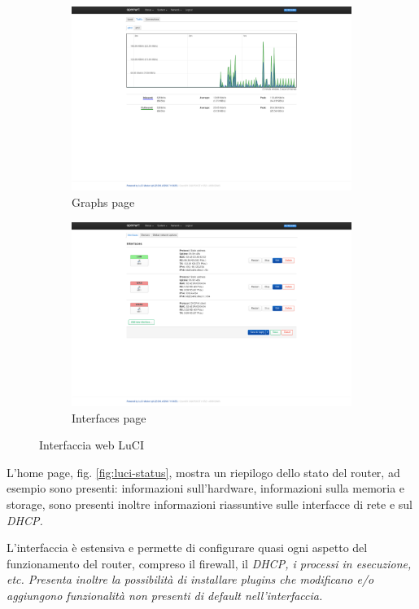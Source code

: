 \begin{figure}[H]
    \begin{subfigure}{0.5\linewidth}
        \centering
        \includegraphics[height=0.65\linewidth]{immagini/LuCI_graphs}
        \caption{Graphs page}
        \label{fig:luci-graphs}
    \end{subfigure}%
    \hfill
    \begin{subfigure}{0.5\linewidth}
        \centering
        \includegraphics[height=0.65\linewidth]{immagini/LuCI_interfaces}
        \caption{Interfaces page}
        \label{fig:luci-interfaces}
    \end{subfigure}%
    \caption{Interfaccia web LuCI}
\end{figure}


L'home page, fig. \ref{fig:luci-status}, mostra un riepilogo dello stato del router, ad esempio sono presenti: informazioni sull'hardware, informazioni sulla memoria e storage, sono presenti inoltre informazioni riassuntive sulle interfacce di rete e sul \it{DHCP}.

L'interfaccia è estensiva e permette di configurare quasi ogni aspetto del funzionamento del router, compreso il firewall, il \it{DHCP}, i processi in esecuzione, etc. Presenta inoltre la possibilità di installare plugins che modificano e/o aggiungono funzionalità non presenti di default nell'interfaccia.

